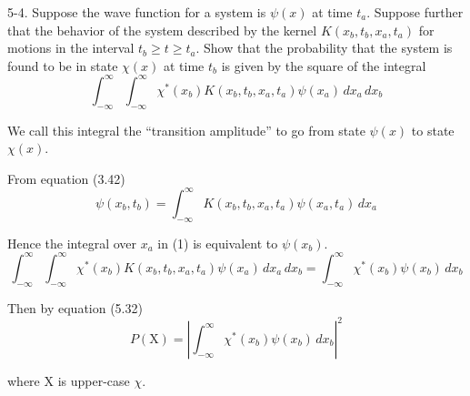 \documentclass[12pt]{article}
\begin{document}
5-4.
Suppose the wave function for a system is $\psi(x)$ at time $t_a$.
Suppose further that the behavior of the system described by
the kernel $K(x_b,t_b,x_a,t_a)$ for motions in the interval
$t_b\ge t\ge t_a$.
Show that the probability that the system is found to be in state
$\chi(x)$ at time $t_b$ is given by the square of the integral
\begin{equation*}
\int_{-\infty}^\infty\int_{-\infty}^\infty
\chi^*(x_b)
K(x_b,t_b,x_a,t_a)
\psi(x_a)
\,dx_a\,dx_b
\tag{1}
\end{equation*}

We call this integral the ``transition amplitude'' to go from
state $\psi(x)$ to state $\chi(x)$.

\bigskip
From equation (3.42)
\begin{equation*}
\psi(x_b,t_b)=\int_{-\infty}^\infty
K(x_b,t_b,x_a,t_a)
\psi(x_a,t_a)
\,dx_a
\end{equation*}

Hence the integral over $x_a$ in (1) is equivalent to $\psi(x_b)$.
\begin{equation*}
\int_{-\infty}^\infty\int_{-\infty}^\infty
\chi^*(x_b)
K(x_b,t_b,x_a,t_a)
\psi(x_a)
\,dx_a\,dx_b
=\int_{-\infty}^\infty
\chi^*(x_b)
\psi(x_b)
\,dx_b
\end{equation*}

Then by equation (5.32)
\begin{equation*}
P(\mathrm X)=\left|
\int_{-\infty}^\infty
\chi^*(x_b)
\psi(x_b)
\,dx_b
\right|^2
\end{equation*}

where $\mathrm X$ is upper-case $\chi$.
\end{document}
